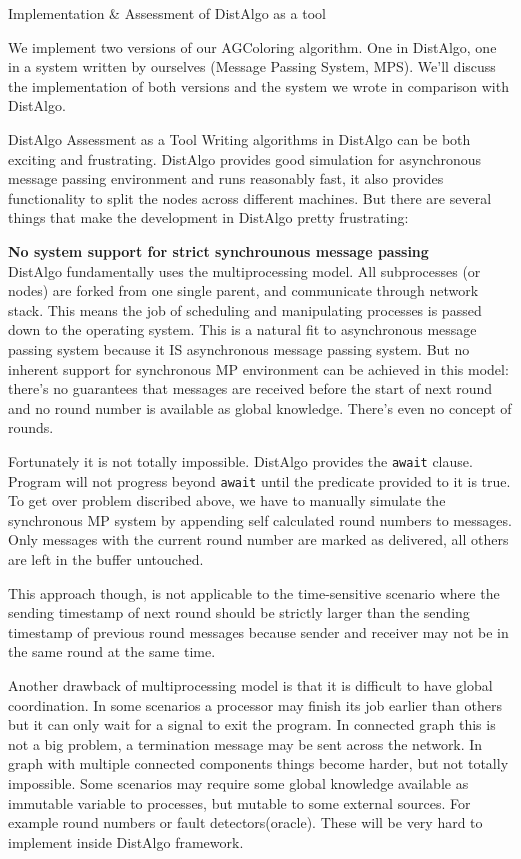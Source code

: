 \documentclass[12pt]{article}  %
\begin{document}
\begin{section}{Implementation \& Assessment of DistAlgo as a tool}

We implement two versions of our AGColoring algorithm. One in DistAlgo, one
in a system written by ourselves (Message Passing System, MPS). 
We'll discuss the implementation of both versions and the system we wrote in comparison with DistAlgo.

\begin{subsection}{DistAlgo Assessment as a Tool}
Writing algorithms in DistAlgo can be both exciting and frustrating. DistAlgo provides good simulation
for asynchronous message passing environment and runs reasonably fast, it also provides functionality to split
the nodes across different machines. But there are several things that make the development in DistAlgo
pretty frustrating:

\noindent
\textbf{No system support for strict synchrounous message passing}\\
DistAlgo fundamentally uses the multiprocessing model. All subprocesses (or nodes) are forked from one single
parent, and communicate through network stack. 
This means the job of scheduling and manipulating processes is passed down to the operating system.
This is a natural fit to asynchronous message passing system because it IS asynchronous message passing system.
But no inherent support for synchronous MP environment can be achieved in this model: there's no guarantees that 
messages are received before the start of next round and no round number is available as global knowledge. 
There's even no concept of rounds. 

Fortunately it is not totally impossible. DistAlgo provides the \texttt{await} clause. Program will not progress
beyond \texttt{await} until the predicate provided to it is true.
To get over problem discribed above, we have to manually simulate the synchronous
MP system by appending self calculated round numbers to messages. Only messages with the current round number
are marked as delivered, all others are left in the buffer untouched. 

This approach though, is not applicable to the time-sensitive scenario where the sending timestamp of next round should be
strictly larger than the sending timestamp of previous round messages because sender and receiver may not be
in the same round at the same time.

Another drawback of multiprocessing model is that it is difficult to have global coordination. In some scenarios
a processor may finish its job earlier than others but it can only wait for a signal to exit the program. In connected
graph this is not a big problem, a termination message may be sent across the network. 
In graph with multiple connected components things become harder, but not totally impossible. Some scenarios may
require some global knowledge available as immutable variable to processes, but mutable to some external sources. For example
round numbers or fault detectors(oracle). These will be very hard to implement inside DistAlgo framework.


\end{subsection}
\end{section}
\end{document}
